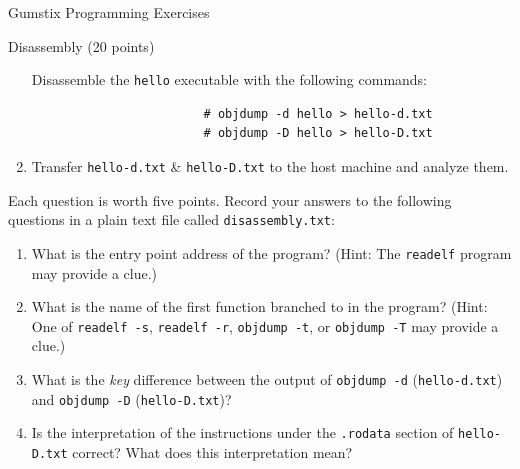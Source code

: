 \documentclass{article}
\begin{document}
\begin{section}{Gumstix Programming Exercises}
\begin{subsection}{Disassembly (20 points)}
\begin{enumerate}
				\begin{item}
					Disassemble the \texttt{hello} executable with the following commands:
					\begin{verbatim}
						# objdump -d hello > hello-d.txt
						# objdump -D hello > hello-D.txt
					\end{verbatim}
				\end{item}

				\item Transfer \texttt{hello-d.txt} \& \texttt{hello-D.txt} to the host
				      machine and analyze them.
			\end{enumerate}
			Each question is worth five points.
			Record your answers to the following questions in a plain text file
			called \texttt{disassembly.txt}:
			\begin{enumerate}
				\item What is the entry point address of the program?  (Hint: The
				      \texttt{readelf} program may provide a clue.)

				\item What is the name of the first function branched to in the program?
				      (Hint: One of \verb|readelf -s|, \verb|readelf -r|,
				      \verb|objdump -t|, or \verb|objdump -T| may provide a clue.)

				\item What is the \emph{key} difference between the output of \verb|objdump -d|
				      (\texttt{hello-d.txt}) and \verb|objdump -D| (\texttt{hello-D.txt})?

				\item Is the interpretation of the instructions under the \texttt{.rodata}
				      section of \texttt{hello-D.txt} correct?  What does this
				      interpretation mean?
			\end{enumerate}
		\end{subsection}
	\end{section}
\end{document}

